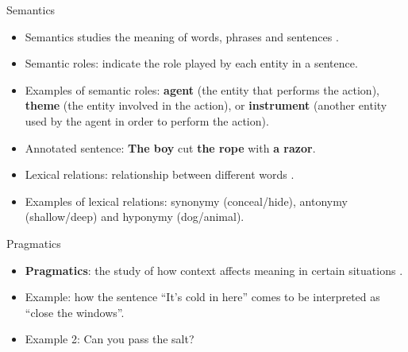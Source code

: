 \documentclass[handout]{beamer}
\begin{document}
\begin{frame}{Semantics}
\scriptsize{
\begin{itemize}
\item Semantics studies the meaning of words, phrases and sentences \cite{JohnsonMLSS}.
\item Semantic roles: indicate the role played by each entity in a sentence.
\item Examples of semantic roles: \textcolor[rgb]{0.00,0.00,1.00}{\textbf{agent}} (the entity that performs the action), \textcolor[rgb]{1.00,0.00,0.00}{\textbf{theme}} (the entity involved in the action), or \textcolor[rgb]{0.00,1.00,0.00}{\textbf{instrument}} (another entity used by the agent in order to perform the action).  
\item Annotated sentence: \textcolor[rgb]{0.00,0.00,1.00}{\textbf{The boy}}  cut \textcolor[rgb]{1.00,0.00,0.00}{\textbf{the rope}} with \textcolor[rgb]{0.00,1.00,0.00}{\textbf{a razor}}.
\item Lexical relations: relationship between different words \cite{yule2016study}.
\item Examples of lexical relations: synonymy (conceal/hide), antonymy (shallow/deep) and hyponymy (dog/animal).
\end{itemize}

}


\end{frame}



\begin{frame}{Pragmatics}
\scriptsize{
\begin{itemize}
\item \textbf{Pragmatics}: the study of how context affects meaning in certain situations \cite{fromkin2018introduction}.
\item Example: how the sentence ``It’s cold in here'' comes to be interpreted as ``close the windows''.
\item Example 2: Can you pass the salt?
\end{itemize}

}


\end{frame}
\end{document}
